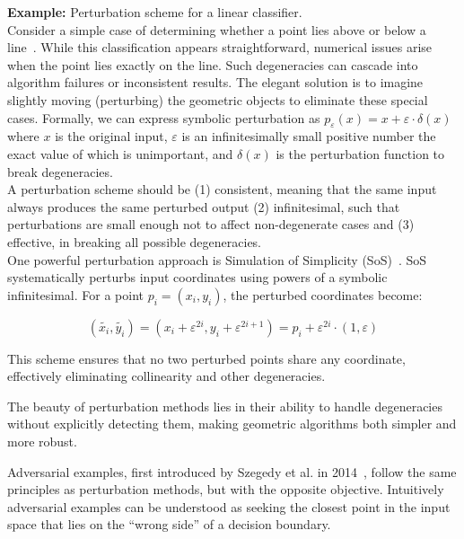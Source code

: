 \documentclass[a4paper, oneside]{discothesis}
\begin{document}
\begin{examplebox}
	\textbf{Example:} Perturbation scheme for a linear classifier. \\

	Consider a simple case of determining whether a point lies above or below a line~\cite{de2000computational}. While this classification appears straightforward, numerical issues arise when the point lies exactly on the line. Such degeneracies can cascade into algorithm failures or inconsistent results. The elegant solution is to imagine slightly moving (perturbing) the geometric objects to eliminate these special cases. Formally, we can express symbolic perturbation as $p_\varepsilon(x) = x + \varepsilon \cdot \delta(x)$ where $x$ is the original input, $\varepsilon$ is an infinitesimally small positive number the exact value of which is unimportant, and $\delta(x)$ is the perturbation function to break degeneracies. \\

	A perturbation scheme should be (1) consistent, meaning that the same input always produces the same perturbed output (2) infinitesimal, such that perturbations are small enough not to affect non-degenerate cases and (3) effective, in breaking all possible degeneracies. \\

	One powerful perturbation approach is Simulation of Simplicity (SoS)~\cite{franklin2022implementing, edelsbrunner2002topological, edelsbrunner2001sink, edelsbrunner1990simulation, levy2016robustness, schorn1993axiomatic}. SoS systematically perturbs input coordinates using powers of a symbolic infinitesimal. For a point $p_i = (x_i, y_i)$, the perturbed coordinates become:

	$$(\tilde{x_i}, \tilde{y_i}) = (x_i + \varepsilon^{2i}, y_i + \varepsilon^{2i+1}) = p_i + \varepsilon^{2i} \cdot (1, \varepsilon)$$

	This scheme ensures that no two perturbed points share any coordinate, effectively eliminating collinearity and other degeneracies.
\end{examplebox}

The beauty of perturbation methods lies in their ability to handle degeneracies without explicitly detecting them, making geometric algorithms both simpler and more robust.

Adversarial examples, first introduced by Szegedy et al. in 2014~\cite{szegedy2013intriguing}, follow the same principles as perturbation methods, but with the opposite objective. Intuitively adversarial examples can be understood as seeking the closest point in the input space that lies on the ``wrong side'' of a decision boundary.
\end{document}
